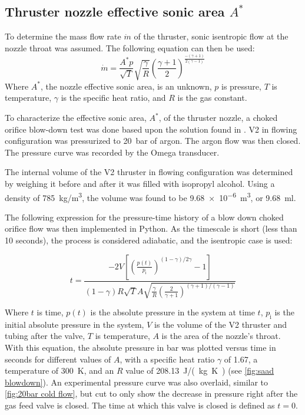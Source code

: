         \subsection{Thruster nozzle effective sonic area $A^*$}

            To determine the mass flow rate $\dot{m}$ of the thruster, sonic isentropic flow at the nozzle throat was assumed. The following equation can then be used:
            \begin{equation}
                \dot{m} = \frac{A^* p}{\sqrt{T}}\sqrt{\frac{\gamma}{R}}\left(\frac{\gamma + 1}{2}\right)^{\frac{-(\gamma + 1)}{2(\gamma-1)}}
            \end{equation}
            Where $A^*$, the nozzle effective sonic area, is an unknown, $p$ is pressure, $T$ is temperature, $\gamma$ is the specific heat ratio, and $R$ is the gas constant.
        
            To characterize the effective sonic area, $A^*$, of the thruster nozzle, a choked orifice blow-down test was done based upon the solution found in \textcite{saadCompressibleFluidFlow}. V2 in flowing configuration was pressurized to \qty{20}{bar} of argon. The argon flow was then closed. The pressure curve was recorded by the Omega transducer.

            The internal volume of the V2 thruster in flowing configuration was determined by weighing it before and after it was filled with isopropyl alcohol. Using a density of \qty{785}{kg/m^3}, the volume was found to be \qty{9.68e-6}{m^3}, or \qty{9.68}{ml}.

            The following expression for the pressure-time history of a blow down choked orifice flow \cite{saadCompressibleFluidFlow} was then implemented in Python. As the timescale is short (less than 10 seconds), the process is considered adiabatic, and the isentropic case is used:

            \begin{equation}
                t =  \frac{-2V \left[\left(\frac{p(t)}{p_\mathrm{i}}\right)^{(1-\gamma) / 2\gamma} -1 \right]}{(1-\gamma) R \sqrt{T} A \sqrt{\frac{\gamma}{R}\left(\frac{2}{\gamma + 1}\right)^{(\gamma+1) / (\gamma-1)}}}
            \end{equation}

            Where $t$ is time, $p(t)$ is the absolute pressure in the system at time $t$, $p_\mathrm{i}$ is the initial absolute pressure in the system, $V$ is the volume of the V2 thruster and tubing after the valve, $T$ is temperature, $A$ is the area of the nozzle's throat. With this equation, the absolute pressure in bar was plotted versus time in seconds for different values of $A$, with a specific heat ratio $\gamma$ of 1.67, a temperature of \qty{300}{K}, and an $R$ value of \qty{208.13}{J/(kg.K)} (see \autoref{fig:saad blowdown}). An experimental pressure curve was also overlaid, similar to \autoref{fig:20bar cold flow}, but cut to only show the decrease in pressure right after the gas feed valve is closed. The time at which this valve is closed is defined as $t=0$.

